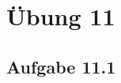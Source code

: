 \documentclass{standalone}
\begin{document}
\section{Übung 11}
\subsection{Aufgabe 11.1}
\end{document}
